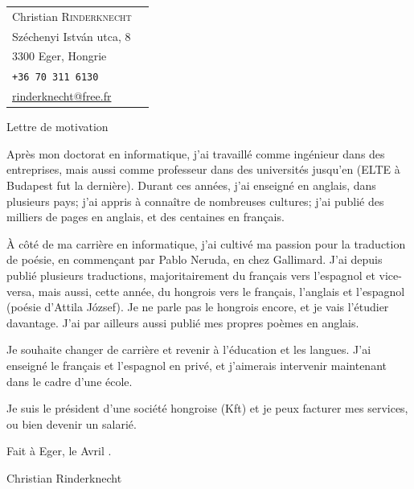 \documentclass[a4paper,11pt]{article}
\begin{document}
\noindent
\begin{tabular}{@{}l@{\qquad\qquad\qquad}r@{}}
  Christian \textsc{Rinderknecht}
  & \\
  Széchenyi István utca, 8
  & \\
  3300 Eger, Hongrie \\
  \texttt{+36 70 311 6130} \\
  \url{rinderknecht@free.fr}
\end{tabular}

\bigskip

\begin{center}
  \large Lettre de motivation
\end{center}

\bigskip

Après mon doctorat en informatique, j'ai travaillé comme ingénieur
dans des entreprises, mais aussi comme professeur dans des universités
jusqu'en  (ELTE à Budapest fut la dernière). Durant
ces années, j'ai enseigné en anglais, dans plusieurs pays; j'ai appris
à connaître de nombreuses cultures; j'ai publié des milliers de pages
en anglais, et des centaines en français.

À côté de ma carrière en informatique, j'ai cultivé ma passion pour la
traduction de poésie, en commençant par Pablo Neruda, en
 chez Gallimard. J'ai depuis publié plusieurs
traductions, majoritairement du français vers l'espagnol et
vice-versa, mais aussi, cette année, du hongrois vers le français,
l'anglais et l'espagnol (poésie d'Attila József). Je ne parle pas le
hongrois encore, et je vais l'étudier davantage. J'ai par ailleurs
aussi publié mes propres poèmes en anglais.

Je souhaite changer de carrière et revenir à l'éducation et les
langues. J'ai enseigné le français et l'espagnol en privé, et
j'aimerais intervenir maintenant dans le cadre d'une école.

Je suis le président d'une société hongroise (Kft) et je peux facturer
mes services, ou bien devenir un salarié.

\bigskip
\bigskip

\hfill Fait à Eger, le  Avril .

\bigskip
\bigskip
\bigskip
\bigskip
\hfill Christian Rinderknecht

\bigskip
\end{document}

